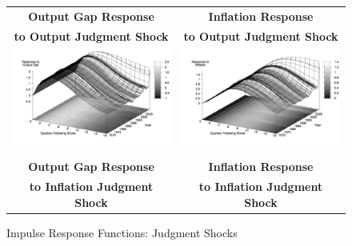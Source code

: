 \documentclass[12pt]{article}
\begin{document}
{\begin{figure}\caption{Impulse Response Functions: Judgment Shocks}\label{fg:irf_judgment}
\hspace*{-4pc}
\begin{tabular}{cc}\\
\textbf{Output Gap Response} & \textbf{Inflation Response} \\
\textbf{to Output Judgment Shock} & \textbf{to Output Judgment Shock}  \\
\includegraphics[scale=0.12]{images/Irf16_Output_Gap_Output_Judgment_Shock.png} & \includegraphics[scale=0.12]{images/Irf16_Inflation_Output_Judgment_Shock.png} \\\\
\textbf{Output Gap Response} & \textbf{Inflation Response} \\ 
\textbf{to Inflation Judgment Shock} & \textbf{to Inflation Judgment Shock}  \\

\end{tabular}
\end{figure}}
\end{document}
